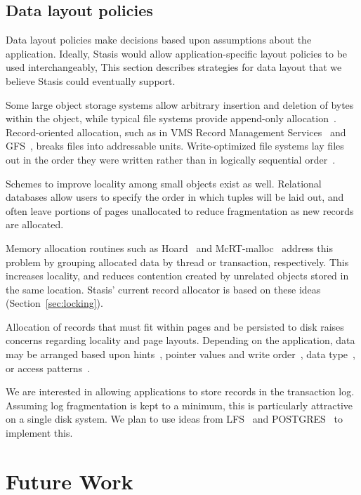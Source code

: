\documentclass[letterpaper,twocolumn,10pt]{article}
\newcommand{\yad}{Stasis\xspace}
\newcommand{\yads}{Stasis'\xspace}
\begin{document}
\subsection{Data layout policies}
\label{sec:malloc}
Data layout policies make decisions based upon
assumptions about the application.  Ideally, \yad would allow
application-specific layout policies to be used interchangeably, 
This section describes strategies for data
layout that we believe \yad could eventually support.

Some large object storage systems allow arbitrary insertion and deletion of bytes~\cite{esm}
within the object, while typical file systems
provide append-only allocation~\cite{ffs}.
Record-oriented allocation, such as in VMS Record Management Services~\cite{vms} and GFS~\cite{gfs}, breaks files into addressable units.
Write-optimized file systems lay files out in the order they
were written rather than in logically sequential order~\cite{lfs}.  

Schemes to improve locality among small
objects exist as well. Relational databases allow users to specify the order
in which tuples will be laid out, and often leave portions of pages
unallocated to reduce fragmentation as new records are allocated.

Memory allocation routines such as Hoard~\cite{hoard} and
McRT-malloc~\cite{mcrt} address this problem by grouping allocated
data by thread or transaction, respectively.  This increases
locality, and reduces contention created by unrelated objects stored
in the same location.
\yads current record allocator is based on these ideas (Section~\ref{sec:locking}).

Allocation of records that must fit within pages and be persisted to
disk raises concerns regarding locality and page layouts.  Depending
on the application, data may be arranged based upon
hints~\cite{cricket}, pointer values and write order~\cite{starburst},
data type~\cite{orion}, or access
patterns~\cite{storageReorganization}.

We are interested in allowing applications to store records in
the transaction log.  Assuming log fragmentation is kept to a
minimum, this is particularly attractive on a single disk system.  We
plan to use ideas from LFS~\cite{lfs} and POSTGRES~\cite{postgres}
to implement this.

\section{Future Work}
\end{document}
